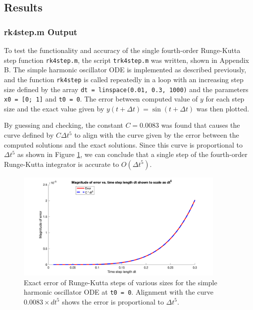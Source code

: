\documentclass[10pt]{article}
\def\code#1{\texttt{#1}} %
\begin{document}
\subsection*{Results}

\subsubsection*{rk4step.m Output}

To test the functionality and accuracy of the single fourth-order Runge-Kutta step function
\code{rk4step.m}, the script \code{trk4step.m} was written, shown in Appendix B. The simple harmonic 
oscillator ODE is implemented as described previously, and the function \code{rk4step} is called 
repeatedly in a loop with an increasing step size defined by the array 
\code{dt = linspace(0.01, 0.3, 1000)} and the parameters \code{x0 = [0; 1]} and \code{t0 = 0}. The 
error between computed value of $y$ for each step size and the exact value given by 
$y(t + \Delta t) = \sin(t + \Delta t)$ was then plotted.  

By guessing and checking, the constant $C = 0.0083$ was found that causes the curve defined by 
$C \Delta t^5$ to align with the curve given by the error between the computed solutions and the 
exact solutions. Since this curve is proportional to $\Delta t^5$ as shown in Figure \ref{rk4step_fig},
we can conclude that a single step of the fourth-order Runge-Kutta integrator is accurate to 
$O(\Delta t^5)$.

\begin{figure}[H]
\centering
\includegraphics[width=0.9\textwidth]{rk4step.png}
\caption{Exact error of Runge-Kutta steps of various sizes for the simple harmonic oscillator ODE at 
\code{t0 = 0}. Alignment with the curve $0.0083 \times dt^5$ shows the error is proportional to 
$\Delta t^5$.}\label{rk4step_fig}
\end{figure}
\end{document}
